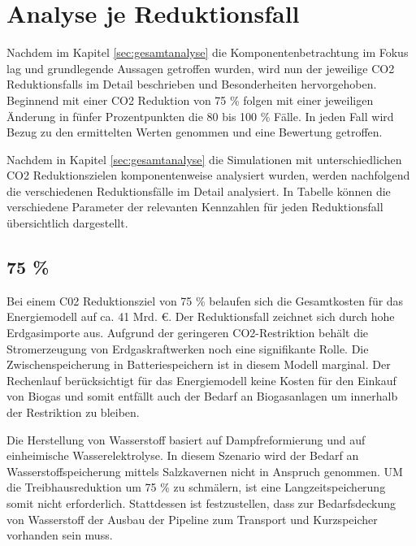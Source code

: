 \section{Analyse je Reduktionsfall}
\label{sec:reduktionsfaelle}
Nachdem im Kapitel \ref{sec:gesamtanalyse} die Komponentenbetrachtung im Fokus lag und grundlegende Aussagen getroffen wurden, wird nun der jeweilige CO2 Reduktionsfalls im Detail beschrieben und Besonderheiten hervorgehoben. Beginnend mit einer CO2 Reduktion von 75 \% folgen mit einer jeweiligen Änderung in fünfer Prozentpunkten die 80 bis 100 \% Fälle. In jeden Fall wird Bezug zu den ermittelten Werten genommen und eine Bewertung getroffen.

Nachdem in Kapitel \ref{sec:gesamtanalyse} die Simulationen mit unterschiedlichen CO2 Reduktionszielen komponentenweise analysiert wurden, werden nachfolgend die verschiedenen Reduktionsfälle im Detail analysiert. In Tabelle  können die verschiedene Parameter der relevanten Kennzahlen für jeden Reduktionsfall übersichtlich dargestellt.



\subsection{75 \%}
Bei einem C02 Reduktionsziel von 75 \% belaufen sich die Gesamtkosten für das Energiemodell auf ca. 41 Mrd. €. Der Reduktionsfall zeichnet sich durch hohe Erdgasimporte aus. Aufgrund der geringeren CO2-Restriktion behält die Stromerzeugung von Erdgaskraftwerken noch eine signifikante Rolle. Die Zwischenspeicherung in Batteriespeichern ist in diesem Modell marginal. Der Rechenlauf berücksichtigt für das Energiemodell keine Kosten für den Einkauf von Biogas und somit entfällt auch der Bedarf an Biogasanlagen um innerhalb der Restriktion zu bleiben. 

Die Herstellung von Wasserstoff basiert auf Dampfreformierung und auf einheimische Wasserelektrolyse. In diesem Szenario wird der Bedarf an Wasserstoffspeicherung mittels Salzkavernen nicht in Anspruch genommen. UM die Treibhausreduktion um 75 \% zu schmälern, ist eine Langzeitspeicherung somit nicht erforderlich. Stattdessen ist festzustellen, dass zur Bedarfsdeckung von Wasserstoff der Ausbau der Pipeline zum Transport und Kurzspeicher vorhanden sein muss. 

